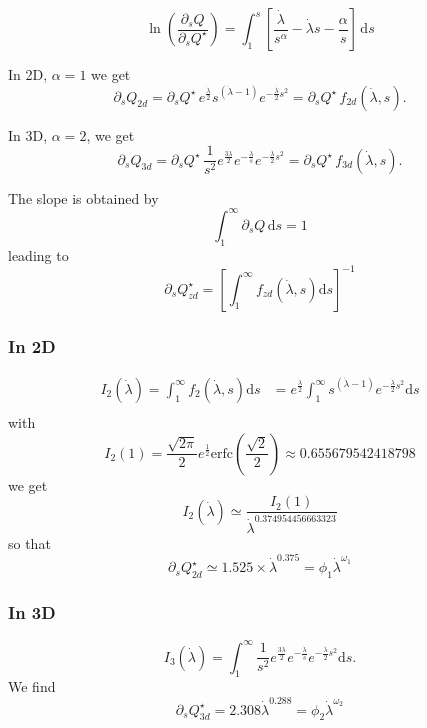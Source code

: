 \documentclass[11pt]{revtex4}
\begin{document}
\begin{equation}
	\ln \left(\dfrac{\partial_s Q}{\partial_sQ^\star}\right) = \int_1^s \left[\dfrac{\dot\lambda}{s^\alpha} - \dot\lambda s -\dfrac{\alpha}{s}\right] \,\mathrm{d}s
\end{equation}

In 2D, $\alpha=1$ we get
\begin{equation}
	\label{eq:dsQ2d}
	\partial_s Q_{2d} = \partial_s Q^\star \, e^{\frac{\dot\lambda}{2}}s^{(\dot\lambda-1)}e^{-\frac{\dot\lambda}{2}s^2} = \partial_s Q^\star \, f_{2d}(\dot\lambda,s).
\end{equation}

In 3D, $\alpha=2$, we get
\begin{equation}
	\label{eq:dsQ3d}
	\partial_s Q_{3d} = \partial_s Q^\star \, \dfrac{1}{s^2} e^{\frac{3\dot\lambda}{2}} e^{-\frac{\dot\lambda}{s}} e^{-\frac{\dot\lambda}{2}s^2} = \partial_s Q^\star \, f_{3d}(\dot\lambda,s).
\end{equation}

The slope is obtained by
$$
	\int_1^\infty \partial_s Q \, \mathrm{d} s = 1
$$
leading to
\begin{equation}
	\partial_sQ^\star_{zd} = \left[ \int_1^\infty f_{zd}(\dot\lambda,s) \mathrm{d}s \right] ^{-1}
\end{equation}

\subsubsection{In 2D}
\begin{equation}
	\begin{array}{rl}
	I_2(\dot\lambda) = \int_1^\infty f_2(\dot\lambda,s) \mathrm{d}s & =  e^{\frac{\dot\lambda}{2}}\int_1^\infty s^{(\dot\lambda-1)}e^{-\frac{\dot\lambda}{2}s^2 } \mathrm{d}s\\
	\end{array}
\end{equation}
with 
$$
	I_2(1) = \dfrac{\sqrt{2\pi}}{2} e^{\frac{1}{2}} \mathrm{erfc}
	\left(\dfrac{\sqrt{2}}{2}\right) \approx 0.655679542418798
$$
we get 
$$
	I_2(\dot\lambda) \simeq \dfrac{I_2(1)}{\dot\lambda^{0.374954456663323}}
$$
so that
\begin{equation}
	\partial_s Q^\star_{2d} \simeq 1.525 \times {\dot\lambda}^{0.375} = \phi_1 {\dot\lambda}^{\omega_1}
\end{equation}


\subsubsection{In 3D}
\begin{equation}
	I_3(\dot\lambda) = \int_1^\infty \dfrac{1}{s^2} e^{\frac{3\dot\lambda}{2}} e^{-\frac{\dot\lambda}{s}} e^{-\frac{\dot\lambda}{2}s^2} \mathrm{d}s.
\end{equation}
We find
\begin{equation}
	\partial_s Q^\star_{3d} = 2.308 {\dot\lambda}^{0.288} = \phi_2 {\dot\lambda} ^ {\omega_2}
\end{equation}
\end{document}
